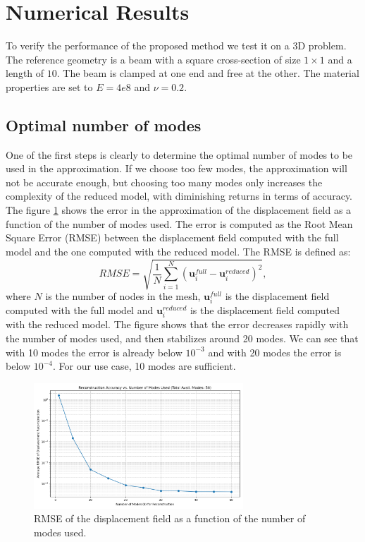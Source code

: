 \section{Numerical Results}
\label{sec:numerical_results}
To verify the performance of the proposed method we test it on a 3D problem. The reference geometry is a beam  with a square cross-section of size $1 \times 1$ and a length of $10$. The beam is clamped at one end and free at the other. The material properties are set to $E = 4e8$ and $\nu = 0.2$. 
\subsection{Optimal number of modes}
\label{sec:optimal_number_modes}
One of the first steps is clearly to determine the optimal number of modes to be used in the approximation. If we choose too few modes, the approximation will not be accurate enough, but choosing too many modes only increases the complexity of the reduced model, with diminishing returns in terms of accuracy. The figure \ref{fig:optimal_number_modes} shows the error in the approximation of the displacement field as a function of the number of modes used. The error is computed as the Root Mean Square Error (RMSE) between the displacement field computed with the full model and the one computed with the reduced model. The RMSE is defined as:
\begin{equation}
    RMSE = \sqrt{\frac{1}{N}\sum_{i=1}^N (\bm{u}_i^{full} - \bm{u}_i^{reduced})^2},
\end{equation}
where $N$ is the number of nodes in the mesh, $\bm{u}_i^{full}$ is the displacement field computed with the full model and $\bm{u}_i^{reduced}$ is the displacement field computed with the reduced model. The figure shows that the error decreases rapidly with the number of modes used, and then stabilizes around 20 modes. We can see that with 10 modes the error is already below \(10^{-3}\) and with 20 modes the error is below \(10^{-4}\). For our use case, 10 modes are sufficient.
\begin{figure}[H]
    \centering
    \includegraphics[width=0.7\textwidth]{Images/rmse_vs_modes.png}
    \caption{RMSE of the displacement field as a function of the number of modes used.}
    \label{fig:optimal_number_modes}
\end{figure}

